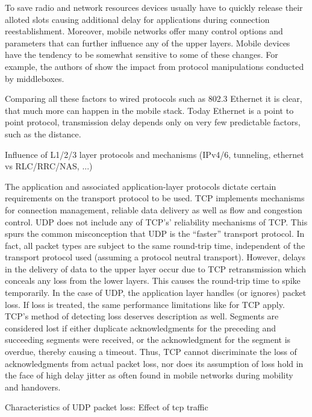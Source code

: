 To save radio and network resources devices usually have to quickly release their alloted slots causing additional delay for applications during connection reestablishment. Moreover, mobile networks offer many control options and parameters that can further influence any of the upper layers. Mobile devices have the tendency to be somewhat sensitive to some of these changes. For example, the authors of \cite{sigcomm11middleboxes} show the impact from protocol manipulations conducted by middleboxes. 

Comparing all these factors to wired protocols such as 802.3 Ethernet it is clear, that much more can happen in the mobile stack. Today Ethernet is a point to point protocol, transmission delay depends only on very few predictable factors, such as the distance.

 Influence of L1/2/3 layer protocols and mechanisms (IPv4/6, tunneling, ethernet vs RLC/RRC/NAS, ...)


The application and associated application-layer protocols dictate certain requirements on the transport protocol to be used. \gls{TCP} implements mechanisms for connection management, reliable data delivery as well as flow and congestion control.
\gls{UDP} does not include any of \gls{TCP}'s' reliability mechanisms of \gls{TCP}. This spurs the common misconception that \gls{UDP} is the ``faster'' transport protocol. In fact, all packet types are subject to the same round-trip time, independent of the transport protocol used (assuming a protocol neutral transport).
However, delays in the delivery of data to the upper layer occur due to \gls{TCP} retransmission which conceals any loss from the lower layers. This causes the round-trip time to spike temporarily. In the case of \gls{UDP}, the application layer handles (or ignores) packet loss. If loss is treated, the same performance limitations like for \gls{TCP} apply.
\gls{TCP}'s method of detecting loss deserves description as well. Segments are considered lost if either duplicate acknowledgments for the preceding and succeeding segments were received, or the acknowledgment for the segment is overdue, thereby causing a timeout. Thus, \gls{TCP} cannot discriminate the loss of acknowledgments from actual packet loss, nor does its assumption of loss hold in the face of high delay jitter as often found in mobile networks during mobility and handovers.

Characteristics of UDP packet loss: Effect of tcp traffic \cite{sawashima97characteristics}


